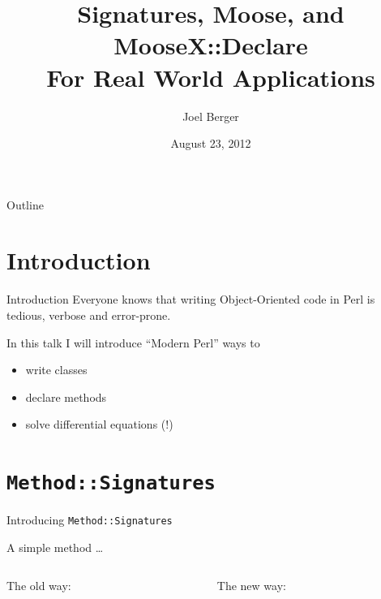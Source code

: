 \documentclass[mathserif]{beamer}
\title[Real World Moose]{Signatures, Moose, and MooseX::Declare\\For Real World Applications}
\author{Joel Berger}
\institute[UIC]{University of Illinois at Chicago}
\date{August 23, 2012}
\providecommand{\code}[1]{{\texttt{\scriptsize{#1}}}}
\providecommand{\inputcode}[1]{
  \begin{block}{}
    \scriptsize{}
  \end{block}
}
\begin{document}
\begin{frame}
  \maketitle
\end{frame}

\begin{frame}{Outline}
  \tableofcontents
\end{frame}


\section{Introduction}

\begin{frame}{Introduction}
  Everyone knows that writing Object-Oriented code in Perl is tedious, verbose and error-prone.

  \begin{center}
  \end{center}

  In this talk I will introduce ``Modern Perl'' ways to
  \begin{itemize}
    \item write classes
    \item declare methods
    \item solve differential equations (!)
  \end{itemize}
\end{frame}

\section{\code{Method::Signatures}}

\begin{frame}{Introducing \texttt{Method::Signatures}}

A simple method \ldots

\vfill

\begin{columns}
  \begin{column}{0.49\linewidth}
    The old way:
    \inputcode{signatures/old}
  \end{column}
  \begin{column}{0.49\linewidth}
    The new way:
    \inputcode{signatures/new}
  \end{column}
\end{columns}
\end{frame}
\end{document}
